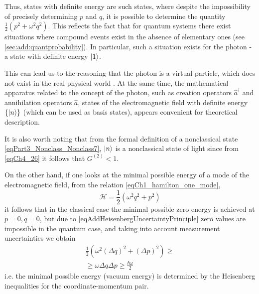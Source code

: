 \begin{remark}
  Thus, states with definite energy are such states,
  where despite the impossibility of precisely determining $p$
  and $q$, it is possible to determine the quantity 
  \(
  \frac{1}{2} \left(p^2 +
  \omega^2q^2\right)
  \). This reflects the fact that for quantum systems there exist
  situations where compound events exist in the absence
  of elementary ones (see \autoref{sec:add:quantprobability}). 
  In particular, such a situation exists for the photon
  - a state with definite energy $\ket{1}$.

  This can lead us to the reasoning that the photon is a
  virtual particle, which does not exist in the real physical world
  \cite{Lamb1995}. At the same time, the mathematical apparatus related to
  the concept of the photon, such as creation operators $\hat{a}^\dag$ and
  annihilation operators $\hat{a}$, states of the electromagnetic field with
  definite energy $\{\ket{n}\}$ (which can be
  used as basis states), appears convenient
  for theoretical description.

  It is also worth noting that from the formal definition
  of a nonclassical state \eqref{eqPart3_Nonclass_Nonclass7},
  $\ket{n}$ is a nonclassical 
  state of light since from \eqref{eqCh4_26} it follows that $G^{(2)} <
  1$.

  On the other hand, if one looks at the minimal possible energy
  of a mode of the electromagnetic field, from the relation
  \eqref{eqCh1_hamilton_one_mode}, 
  \[
  \mathcal{H} = \frac{1}{2}\left(\omega^2 q^2 + p^2\right)
  \]
  it follows that in the classical case the minimal possible zero
  energy is achieved at $p = 0, q=0$, but due to
  \eqref{eqAddHeisenbergUncertaintyPrinciple} zero values
  are impossible in the quantum case, and taking into account measurement uncertainties
  we obtain 
  \begin{eqnarray}
    \frac{1}{2}\left(\omega^2 (\Delta q)^2 + (\Delta p)^2\right) \ge
    \nonumber \\
    \ge \omega \Delta q \Delta p \ge \frac{\hbar \omega}{2}
    \nonumber
  \end{eqnarray}
  i.e. the minimal possible energy (vacuum energy) is determined
  by the Heisenberg inequalities for the coordinate-momentum pair.  
  \label{rem:antiphoton}
\end{remark}